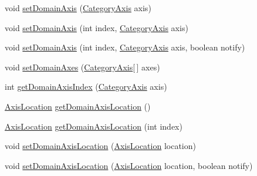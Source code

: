 \begin{DoxyCompactItemize}
\item 
void \mbox{\hyperlink{classorg_1_1jfree_1_1chart_1_1plot_1_1_category_plot_a2d2f1627184e7686e9a74be1f87237f8}{set\+Domain\+Axis}} (\mbox{\hyperlink{classorg_1_1jfree_1_1chart_1_1axis_1_1_category_axis}{Category\+Axis}} axis)
\item 
void \mbox{\hyperlink{classorg_1_1jfree_1_1chart_1_1plot_1_1_category_plot_a1f9906f8a205d94eee2611e4ffd21d70}{set\+Domain\+Axis}} (int index, \mbox{\hyperlink{classorg_1_1jfree_1_1chart_1_1axis_1_1_category_axis}{Category\+Axis}} axis)
\item 
void \mbox{\hyperlink{classorg_1_1jfree_1_1chart_1_1plot_1_1_category_plot_ac80c404198c7794ab85454b5d9c6f23a}{set\+Domain\+Axis}} (int index, \mbox{\hyperlink{classorg_1_1jfree_1_1chart_1_1axis_1_1_category_axis}{Category\+Axis}} axis, boolean notify)
\item 
void \mbox{\hyperlink{classorg_1_1jfree_1_1chart_1_1plot_1_1_category_plot_a844d33e1fd8dcbb9399dddb7cdd95630}{set\+Domain\+Axes}} (\mbox{\hyperlink{classorg_1_1jfree_1_1chart_1_1axis_1_1_category_axis}{Category\+Axis}}\mbox{[}$\,$\mbox{]} axes)
\item 
int \mbox{\hyperlink{classorg_1_1jfree_1_1chart_1_1plot_1_1_category_plot_a1d89a58f4537d598f6eaec10a7b12516}{get\+Domain\+Axis\+Index}} (\mbox{\hyperlink{classorg_1_1jfree_1_1chart_1_1axis_1_1_category_axis}{Category\+Axis}} axis)
\item 
\mbox{\hyperlink{classorg_1_1jfree_1_1chart_1_1axis_1_1_axis_location}{Axis\+Location}} \mbox{\hyperlink{classorg_1_1jfree_1_1chart_1_1plot_1_1_category_plot_aaf592d8e5e782d115441eaea76f88274}{get\+Domain\+Axis\+Location}} ()
\item 
\mbox{\hyperlink{classorg_1_1jfree_1_1chart_1_1axis_1_1_axis_location}{Axis\+Location}} \mbox{\hyperlink{classorg_1_1jfree_1_1chart_1_1plot_1_1_category_plot_a6d3f3b7805d1a24832cf40fa95a56fdc}{get\+Domain\+Axis\+Location}} (int index)
\item 
void \mbox{\hyperlink{classorg_1_1jfree_1_1chart_1_1plot_1_1_category_plot_ac7f82688a2b7a817809144fa9c0d9377}{set\+Domain\+Axis\+Location}} (\mbox{\hyperlink{classorg_1_1jfree_1_1chart_1_1axis_1_1_axis_location}{Axis\+Location}} location)
\item 
void \mbox{\hyperlink{classorg_1_1jfree_1_1chart_1_1plot_1_1_category_plot_a41de193ebdcfd2a1ea3622f2aac896d5}{set\+Domain\+Axis\+Location}} (\mbox{\hyperlink{classorg_1_1jfree_1_1chart_1_1axis_1_1_axis_location}{Axis\+Location}} location, boolean notify)
\item 

\end{DoxyCompactItemize}

